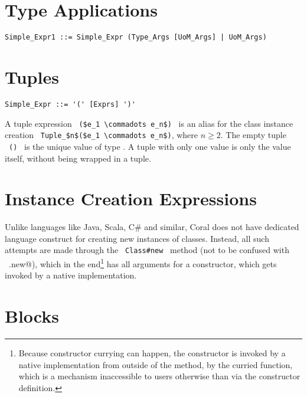 \section{Type Applications}
\label{sec:type-applications}

\syntax\begin{lstlisting}
Simple_Expr1 ::= Simple_Expr (Type_Args [UoM_Args] | UoM_Args)
\end{lstlisting}






\section{Tuples}
\label{sec:tuples}

\syntax\begin{lstlisting}
Simple_Expr ::= '(' [Exprs] ')'
\end{lstlisting}

A tuple expression ~\lstinline!($e_1 \commadots e_n$)!~ is an alias for the class instance creation ~\lstinline!Tuple_$n$($e_1 \commadots e_n$)!, where $n \geq 2$. The empty tuple ~\lstinline!()!~ is the unique value of type . A tuple with only one value is only the value itself, without being wrapped in a tuple. 






\section{Instance Creation Expressions}
\label{sec:instance-creation-exprs}

Unlike languages like Java, Scala, C\# and similar, Coral does not have dedicated language construct for creating new instances of classes. Instead, all such attempts are made through the ~\lstinline!Class#new!~ method (not to be confused with ~\lstinline@Class.new@), which in the end\footnote{Because constructor currying can happen, the constructor is invoked by a native implementation from outside of the  method, by the curried function, which is a mechanism inaccessible to users otherwise than via the constructor definition.} has all arguments for a constructor, which gets invoked by a native implementation. 






\section{Blocks}

